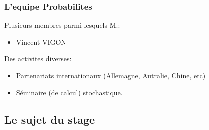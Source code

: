 \begin{frame}
\frametitle{L'equipe Probabilites}
	Plusieurs membres parmi lesquels M.: %
	\begin{itemize}
		\item Vincent VIGON
  \end{itemize}

  \pause
  Des activites diverses:
	\begin{itemize}
		\item Partenariats internationaux (Allemagne, Autralie, Chine, etc)  %
		\item Séminaire (de calcul) stochastique.  %
  \end{itemize}


\end{frame}

\subsection{Le sujet du stage}

